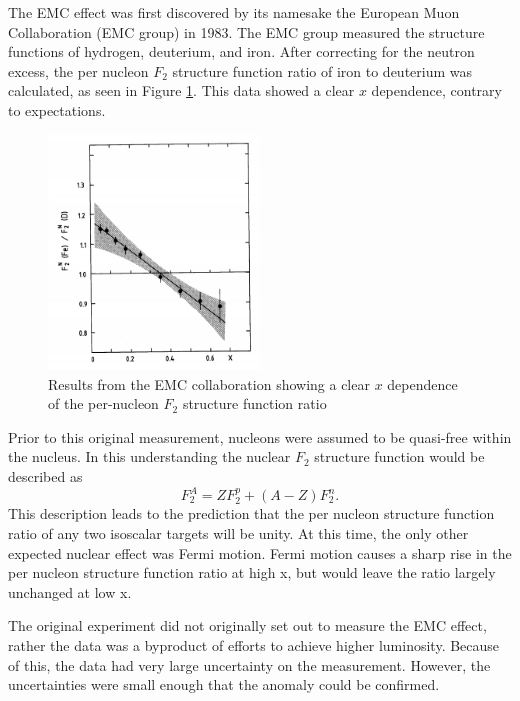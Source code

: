 The EMC effect was first discovered by its namesake the European Muon Collaboration (EMC group) in 1983. The EMC group measured the structure functions of hydrogen, deuterium, and iron. After correcting for the neutron excess, the per nucleon $F_2$ structure function ratio of iron to deuterium was calculated, as seen in Figure \ref{emc_fe}. This data showed a clear $x$ dependence, contrary to expectations.

\begin{figure}
\begin{center}
	\includegraphics[width=0.5\textwidth]{./EMC/fig/original_EMC.png}
	\caption{Results from the EMC collaboration showing a clear $x$ dependence of the per-nucleon $F_2$ structure function ratio\cite{emc_FE}}
	\label{emc_fe}
\end{center}
\end{figure}

Prior to this original measurement, nucleons were assumed to be quasi-free within the nucleus. In this understanding the nuclear $F_2$ structure function would be described as
\begin{equation}
	F_2^A = ZF_2^p + \left(A-Z\right)F_2^n.
\end{equation}
This description leads to the prediction that the per nucleon structure function ratio of any two isoscalar targets will be unity. At this time, the only other expected nuclear effect was Fermi motion. Fermi motion causes a sharp rise in the per nucleon structure function ratio at high x, but would leave the ratio largely unchanged at low x.

The original experiment did not originally set out to measure the EMC effect, rather the data was a byproduct of efforts to achieve higher luminosity. Because of this, the data had very large uncertainty on the measurement. However, the uncertainties were small enough that the anomaly could be confirmed.

